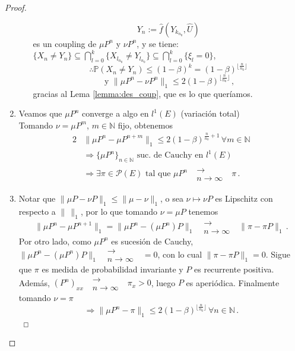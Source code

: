 \documentclass[letterpaper,11pt]{article} %
\theoremstyle{defbreak}
\theoremstyle{propbreak}
\theoremstyle{remark}
\theoremstyle{break}
\def\P{\mathbb{P}}
\def\N{\mathbb{N}}
\def\conv{\mbox{ }\substack{\longrightarrow \\ n\to\infty}\mbox{ }}
\def\negro{\color{black}}
\def\findem{\null\hfill\color{white}a\color{black}_\square}
\begin{document}
\begin{proof}
\begin{enumerate}
\begin{itemize}
        $$ Y_n := \hat{f}(Y_{k_{n_0}},\hat{U})$$
        es un coupling de $\mu P^n$ y $\nu P^n$, 
        y se tiene: $\{X_n\neq Y_n\}\subseteq \displaystyle \bigcap^k_{l=0}\{X_{l_{n_0}}\neq Y_{l_{n_0}}\}\subseteq \bigcap^k_{l=0}\{\xi_l=0\}$,
        $$ \therefore \P(X_n\neq Y_n)\leq (1-\beta)^k=(1-\beta)^{\lfloor\frac{n}{n_0}\rfloor}$$
        $$ \text{ y } \|\mu P^n-\nu P^n\|_1\leq 2(1-\beta)^{\lfloor\frac{n}{n_0}\rfloor} \, ,$$
        gracias al Lema \ref{lemma:des_coup},
        que es lo que queríamos.
    \end{itemize}
    \item Veamos que $\mu P^n$ converge a algo en %
    $l^1(E)$ (variación total)
    \\ Tomando $\nu = \mu P^m$, $m\in\N$ fijo, obtenemos
    \begin{alignat*}{2}
        &  \|\mu P^n-\mu P^{n+m}\|_1\leq 2(1-\beta)^{\frac{n}{n_0}+1}\, \forall m\in\N \\
        & \Longrightarrow \{\mu P^n\}_{n\in\N}\text{ suc. de Cauchy en }l^1(E) \\
        & \Longrightarrow \exists \pi\in\mathcal{P}(E) \text{ tal que }\mu P^n\conv\pi\, .
    \end{alignat*}
    \item Notar que $\|\mu P-\nu P\|_1\leq \|\mu-\nu\|_1$, o sea $\nu\mapsto\nu P$ es Lipschitz con respecto a $\|\,\|_1$, por lo que tomando $\nu=\mu P$ tenemos
    $$ \|\mu P^n-\mu P^{n+1}\|_1=\|\mu P^n-(\mu P^n)P\|_1\conv \|\pi-\pi P\|_1 \, .$$
    Por otro lado, como $\mu P^n$ es sucesión de Cauchy, $\|\mu P^n-(\mu P^n)P\|_1\conv=0$, con lo cual $\|\pi-\pi P\|_1=0$. Sigue que $\pi$ es medida de probabilidad invariante y $P$ es recurrente positiva.
    \\ Además, $(P^n)_{xx}\conv\pi_x>0$, luego $P$ es aperiódica. Finalmente tomando $\nu=\pi$
    $$ \Longrightarrow \|\mu P^n-\pi\|_1\leq 2(1-\beta)^{\lfloor\frac{n}{n_0}\rfloor}\, \forall n\in\N\, .$$
    $\findem$
\end{enumerate}
\negro
\end{proof}
\end{document}
